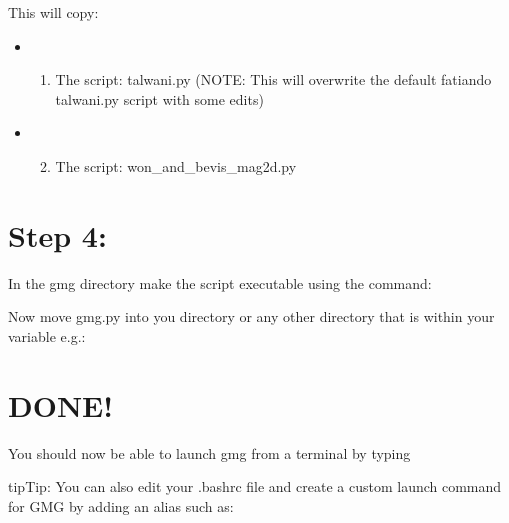 \documentclass[a4paper,12pt,english]{sphinxmanual}
\begin{document}
This will copy:
\begin{itemize}
\item {} \begin{enumerate}
\item {} 
The script: talwani.py (NOTE: This will overwrite the default fatiando talwani.py script with some edits)

\end{enumerate}

\item {} \begin{enumerate}
\setcounter{enumi}{1}
\item {} 
The script: won\_and\_bevis\_mag2d.py

\end{enumerate}

\end{itemize}


\chapter{Step 4:}
\label{\detokenize{installation:step-4}}
In the gmg directory make the  script executable using the command:

%
\begin{sphinxVerbatim}[commandchars=\\\{\}]
  
\end{sphinxVerbatim}

Now move gmg.py into you  directory or any other directory that is within your  variable e.g.:

%
\begin{sphinxVerbatim}[commandchars=\\\{\}]
   
\end{sphinxVerbatim}


\chapter{DONE!}
\label{\detokenize{installation:done}}
You should now be able to launch gmg from a terminal by typing 

\begin{sphinxadmonition}{tip}{Tip:}
You can also edit your .bashrc file and create a custom launch command for GMG by adding an alias such as:

%
\begin{sphinxVerbatim}[commandchars=\\\{\}]
 
\end{sphinxVerbatim}
\end{sphinxadmonition}
\end{document}
